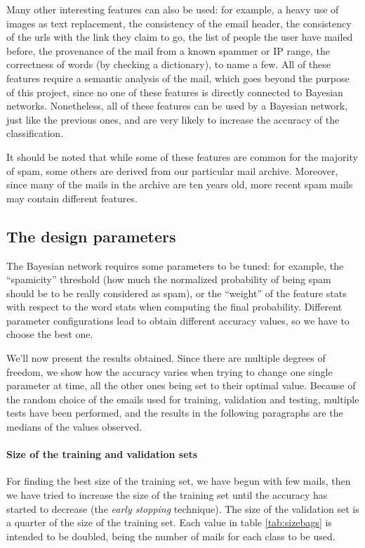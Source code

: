 Many other interesting features can also be used: for example, a heavy use of images as text replacement, the consistency of the email header, the consistency of the urls with the link they claim to go, the list of people the user have mailed before, the provenance of the mail from a known spammer or IP range, the correctness of words (by checking a dictionary), to name a few. All of these features require a semantic analysis of the mail, which goes beyond the purpose of this project, since no one of these features is directly connected to Bayesian networks. Nonetheless, all of these features can be used by a Bayesian network, just like the previous ones, and are very likely to increase the accuracy of the classification.

It should be noted that while some of these features are common for the majority of spam, some others are derived from our particular mail archive. Moreover, since many of the mails in the archive are ten years old, more recent spam mails may contain different features.%

\subsection{The design parameters}
The Bayesian network requires some parameters to be tuned: for example, the ``spamicity'' threshold (how much the normalized probability of being spam should be to be really considered as spam), or the ``weight'' of the feature stats with respect to the word stats when computing the final probability. Different parameter configurations lead to obtain different accuracy values, so we have to choose the best one.

We'll now present the results obtained. Since there are multiple degrees of freedom, we show how the accuracy varies when trying to change one single parameter at time, all the other ones being set to their optimal value. Because of the random choice of the emails used for training, validation and testing, multiple tests have been performed, and the results in the following paragraphs are the medians of the values observed.

\paragraph{Size of the training and validation sets}
For finding the best size of the training set, we have begun with few mails, then we have tried to increase the size of the training set until the accuracy has started to decrease (the \textit{early stopping} technique). The size of the validation set is a quarter of the size of the training set. Each value in table \ref{tab:sizebags} is intended to be doubled, being the number of mails for each class to be used.

